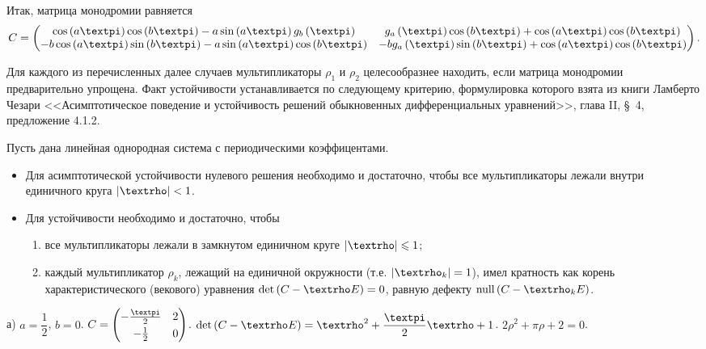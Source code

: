 \documentclass[a5paper,10pt]{article}
\begin{document}
Итак, матрица монодромии равняется
\begin{align*}
    C = \begin{pmatrix} 
        \cos\br{a\pi} \cos\br{b\pi} - a \sin\br{a\pi} g_{b}\br{\pi}
        &  g_{a}\br{\pi} \cos\br{b\pi} + \cos\br{a\pi} \cos\br{b\pi}
        \\
        -b \cos\br{a\pi} \sin\br{b\pi} - a \sin\br{a\pi} \cos\br{b\pi}
        & -b g_{a}\br{\pi} \sin\br{b\pi} + \cos\br{a\pi} \cos\br{b\pi}
    \end{pmatrix}.
\end{align*}

Для каждого из перечисленных далее случаев мультипликаторы $\rho_{1}$ и $\rho_{2}$ целесообразнее находить, если матрица монодромии предварительно упрощена. Факт устойчивости устанавливается по следующему критерию, формулировка которого взята из книги Ламберто Чезари <<Асимптотическое поведение и устойчивость решений обыкновенных дифференциальных уравнений>>, глава II, \S\ 4, предложение 4.1.2.

\begin{framed}
    \begin{criteria} \end{criteria}
    Пусть дана линейная однородная система с периодическими коэффицентами.
    \begin{itemize}
        \item Для асимптотической устойчивости нулевого решения необходимо и достаточно, чтобы все мультипликаторы лежали внутри единичного круга $\vbr{\rho} < 1$.
        \item Для устойчивости необходимо и достаточно, чтобы
        \begin{enumerate}
            \item все мультипликаторы лежали в замкнутом единичном круге $\vbr{\rho} \le 1$;
            \item каждый мультипликатор $\rho_{k}$, лежащий на единичной окружности (т.е. $\vbr{\rho_{k}} = 1$), имел кратность как корень характеристического (векового) уравнения $\det\br{C - \rho E} = 0$, равную дефекту $\nullity\br{C - \rho_{k} E}$.
        \end{enumerate}
    \end{itemize}
\end{framed}

а) $a = \dfrac {1} {2}$, $b = 0$.
$C = \begin{pmatrix} -\frac {\pi} {2} \vspace{1mm} & 2 \\ -\frac {1} {2} & 0 \end{pmatrix}$.
$\det\br{C - \rho E} = \rho^2 + \dfrac {\pi} {2} \rho + 1$.
$2\rho^2 + \pi \rho + 2 = 0$.
\end{document}
